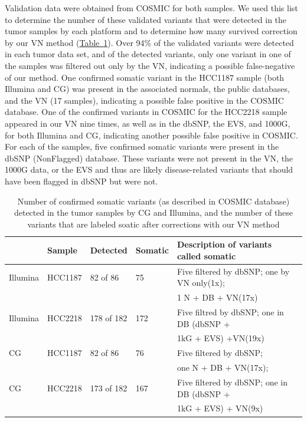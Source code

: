 Validation data were obtained from COSMIC for both samples. We used this list to determine the number of these validated variants that were detected in the tumor samples by each platform and to determine how many survived correction by our VN method (\hyperref[table:table2]{Table~\ref{table:table2}}). Over 94\% of the validated variants were detected in each tumor data set, and of the detected variants, only one variant in one of the samples was filtered out only by the VN, indicating a possible false-negative of our method. One confirmed somatic variant in the HCC1187 sample (both Illumina and CG) was present in the associated normals, the public databases, and the VN (17 samples), indicating a possible false positive in the COSMIC database. One of the confirmed variants in COSMIC for the HCC2218 sample appeared in our VN nine times, as well as in the dbSNP, the EVS, and 1000G, for both Illumina and CG, indicating another possible false positive in COSMIC\@. For each of the samples, five confirmed somatic variants were present in the dbSNP (NonFlagged) database. These variants were not present in the VN, the 1000G data, or the EVS and thus are likely disease-related variants that should have been flagged in dbSNP but were not.

\small
\begin{table}[t!]
\centering
\begin{tabular}{lllll}
          & Sample  & Detected   & Somatic & Description of variants called somatic \\ \hline
Illumina  & HCC1187 & 82 of 86   & 75      & Five filtered by dbSNP; one by VN only(1x); \\
          &         &            &         & 1 N + DB + VN(17x) \\
Illumina  & HCC2218 & 178 of 182 & 172     & Five filtred by dbSNP; one in DB (dbSNP + \\
          &         &            &         & 1kG + EVS) +VN(19x)\\
CG        & HCC1187 & 82 of 86   & 76      & Five filtered by dbSNP;\\
          &         &            &         & one N + DB + VN(17x); \\
CG        & HCC2218 & 173 of 182 & 167     & Five filtered by dbSNP; one in DB (dbSNP + \\
          &         &            &         & 1kG + EVS) + VN(9x) \\
\end{tabular}
\caption{Number of confirmed somatic variants (as described in COSMIC database) detected in the tumor samples by CG and Illumina, and the number of these variants that are labeled soatic after corrections with our VN method}
\label{table:table2}
\end{table}
\normalsize

